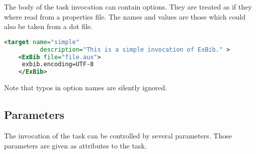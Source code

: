 The body of the task invocation can contain options. They are treated
as if they where read from a properties file. The names and values are
those which could also be taken from a dot file.

\begin{lstlisting}[language=XML,morekeywords={target}]
  <target name="simple"
          description="This is a simple invocation of ExBib." >
    <ExBib file="file.aux">
     exbib.encoding=UTF-8
    </ExBib>
\end{lstlisting}

Note that typos in option names are silently ignored.

\subsection{Parameters}

The invocation of the task can be controlled by several parameters.
Those parameters are given as attributes to the task. 


